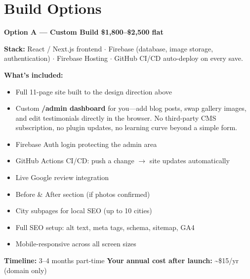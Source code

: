 \documentclass[11pt, letterpaper]{article}
\begin{document}
\section{Build Options}

\vspace{6pt}

\begin{highlight}
\textbf{\color{black}\large Option A --- Custom Build \hfill
\normalsize\$1,800--\$2,500 flat}

\vspace{4pt}
\textbf{Stack:} React / Next.js frontend $\cdot$ Firebase (database, image
storage, authentication) $\cdot$ Firebase Hosting $\cdot$ GitHub CI/CD
auto-deploy on every save.

\vspace{4pt}
\textbf{What's included:}
\begin{itemize}
  \item Full 11-page site built to the design direction above
  \item Custom \textbf{/admin dashboard} for you---add blog posts, swap
        gallery images, and edit testimonials directly in the browser.
        No third-party CMS subscription, no plugin updates, no learning curve
        beyond a simple form.
  \item Firebase Auth login protecting the admin area
  \item GitHub Actions CI/CD: push a change $\to$ site updates automatically
  \item Live Google review integration
  \item Before \& After section (if photos confirmed)
  \item City subpages for local SEO (up to 10 cities)
  \item Full SEO setup: alt text, meta tags, schema, sitemap, GA4
  \item Mobile-responsive across all screen sizes
\end{itemize}

\vspace{4pt}
\textbf{Timeline:} 3--4 months part-time \quad
\textbf{Your annual cost after launch:} \textasciitilde\$15/yr (domain only)
\end{highlight}

\vspace{8pt}
\end{document}
